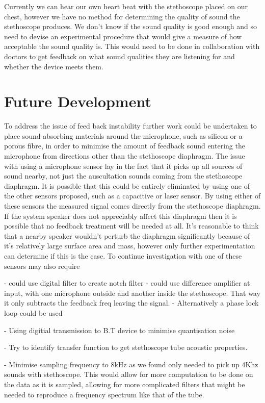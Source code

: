Currently we can hear our own heart beat with the stethoscope placed on our chest, however we have no method for determining the quality of sound the stethoscope produces. We don't know if the sound quality is good enough and so need to devise an experimental procedure that would give a measure of how acceptable the sound quality is. This would need to be done in collaboration with doctors to get feedback on what sound qualities they are listening for and whether the device meets them.
	

\section{Future Development}

To address the issue of feed back instability further work could be undertaken to place sound absorbing materials around the microphone, such as silicon or a porous fibre, in order to minimise the amount of feedback sound entering the microphone from directions other than the stethoscope diaphragm. The issue with using a microphone sensor lay in the fact that it picks up all sources of sound nearby, not just the auscultation sounds coming from the stethoscope diaphragm. It is possible that this could be entirely eliminated by using one of the other sensors proposed, such as a capacitive or laser sensor. By using either of these sensors the measured signal comes directly from the stethoscope diaphragm. If the system speaker does not appreciably affect this diaphragm then it is possible that no feedback treatment will be needed at all. It's reasonable to think that a nearby speaker wouldn't perturb the diaphragm significantly because of it's relatively large surface area and mass, however only further experimentation can determine if this is the case. To continue investigation with one of these sensors may also require 

	- could use digital filter to create notch filter
	- could use difference amplifier at input, with one microphone outside and another inside the stethoscope. That way it only subtracts the feedback freq leaving the signal.
	- Alternatively a phase lock loop could be used

- Using digitial transmission to B.T device to minimise quantisation noise 

- Try to identify transfer function to get stethoscope tube acoustic properties.

- Minimise sampling frequency to 8kHz as we found only needed to pick up 4Khz sounds with stethoscope. This would allow for more computation to be done on the data as it is sampled, allowing for more complicated filters that might be needed to reproduce a frequency spectrum like that of the tube.